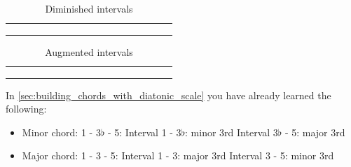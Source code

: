 \begin{table}[h]
	\centering
	\begin{NiceTabular}{*{17}{c}}
		\Block{}{} & \Block{}{} &  & &  & &  & &  & &  & &  & &  & & \Block{}{} \\
		 &  & &  & &  & &  & &  & &  & &  & &  & \\
		 &  & &  & &  & & \Block{}{} &  & & \Block{}{} &  & &  & &  &
	\end{NiceTabular}
	\caption{Diminished intervals}
	\label{tab:guitar_diminished_intervals}
\end{table}

\begin{table}[h]
	\centering
	\begin{NiceTabular}{*{17}{c}}
		\Block{}{} & \Block{}{} &  & &  & &  & &  & &  & &  & &  & & \Block{}{} \\
		 &  & &  & &  & &  & &  & &  & &  & &  & \\
		 &  & &  & &  & &  & & \Block{}{} &  & & \Block{}{} &  & &  &
	\end{NiceTabular}
	\caption{Augmented intervals}
	\label{tab:guitar_augmented_intervals}
\end{table}

In \autoref{sec:building_chords_with_diatonic_scale} you have already learned the following:

\begin{minipage}{0.5\textwidth}
	\begin{itemize}
		\item Minor chord: 1 - 3$\flat$ - 5:
			\subitem Interval 1 - 3$\flat$: minor 3rd
			\subitem Interval 3$\flat$ - 5: major 3rd
	\end{itemize}
\end{minipage}
\hfill
\begin{minipage}{0.5\textwidth}
	\begin{itemize}
		\item Major chord: 1 - 3 - 5:
			\subitem Interval 1 - 3: major 3rd
			\subitem Interval 3 - 5: minor 3rd
	\end{itemize}
\end{minipage}

